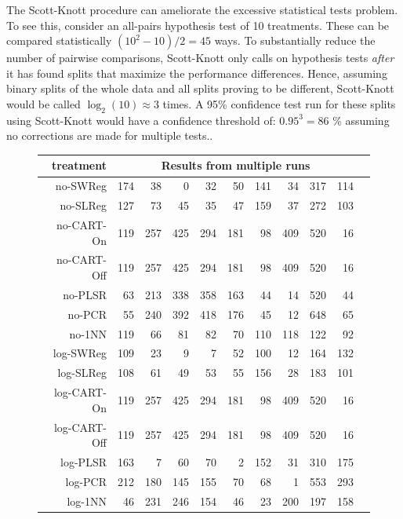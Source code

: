 \documentclass[10pt]{elsarticle}
\begin{document}
The Scott-Knott procedure can ameliorate the excessive statistical tests problem.  To see this, consider an all-pairs hypothesis test of 10 treatments. These can be compared statistically 
\mbox{$(10^2-10)/2=45$} ways.  To substantially reduce the number of pairwise comparisons, Scott-Knott only calls on hypothesis tests {\em after} it has found splits that maximize the performance differences.  Hence, assuming binary splits of the whole data and all splits proving to be different,
Scott-Knott would be called $\log_2(10)\approx 3$ times. 
A 95\% confidence test run for these splits using Scott-Knott would have a confidence threshold of: 
\mbox{$0.95^{3} = 86$} \% assuming no corrections are made for multiple tests..
 
\begin{figure}[!t]
\begin{center}
{\scriptsize\begin{tabular}{r|rrrrrrrrrr}
treatment &  \multicolumn{9}{c}{Results from multiple runs}\\\hline
no-SWReg &   174 &    38 &     0 &    32 &    50 &   141 &    34 &   317 &   114\\
no-SLReg &   127 &    73 &    45 &    35 &    47 &   159 &    37 &   272 &   103\\
no-CART-On &   119 &   257 &   425 &   294 &   181 &    98 &   409 &   520 &    16\\
no-CART-Off &   119 &   257 &   425 &   294 &   181 &    98 &   409 &   520 &    16\\
no-PLSR &    63 &   213 &   338 &   358 &   163 &    44 &    14 &   520 &    44\\
no-PCR &    55 &   240 &   392 &   418 &   176 &    45 &    12 &   648 &    65\\
no-1NN &   119 &    66 &    81 &    82 &    70 &   110 &   118 &   122 &    92\\
log-SWReg &   109 &    23 &     9 &     7 &    52 &   100 &    12 &   164 &   132\\
log-SLReg &   108 &    61 &    49 &    53 &    55 &   156 &    28 &   183 &   101\\
log-CART-On &   119 &   257 &   425 &   294 &   181 &    98 &   409 &   520 &    16\\
log-CART-Off &   119 &   257 &   425 &   294 &   181 &    98 &   409 &   520 &    16\\
log-PLSR &   163 &     7 &    60 &    70 &     2 &   152 &    31 &   310 &   175\\
log-PCR &   212 &   180 &   145 &   155 &    70 &    68 &     1 &   553 &   293\\
log-1NN &    46 &   231 &   246 &   154 &    46 &    23 &   200 &   197 &   158\\\hline
\end{tabular}}
\end{center}


\end{figure}
\end{document}
